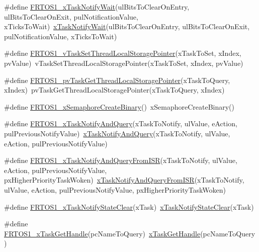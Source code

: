\begin{DoxyCompactItemize}
\item 
\#define \hyperlink{group___f_r_t_o_s1__module_gaa6ec29b95f2aeecae38d52ed20d63c10}{F\+R\+T\+O\+S1\+\_\+x\+Task\+Notify\+Wait}(ul\+Bits\+To\+Clear\+On\+Entry,  ul\+Bits\+To\+Clear\+On\+Exit,  pul\+Notification\+Value,  x\+Ticks\+To\+Wait)~\hyperlink{tasks_8c_a7cab914767933dc732f2c36e3915f6b0}{x\+Task\+Notify\+Wait}(ul\+Bits\+To\+Clear\+On\+Entry, ul\+Bits\+To\+Clear\+On\+Exit, pul\+Notification\+Value, x\+Ticks\+To\+Wait)
\item 
\#define \hyperlink{group___f_r_t_o_s1__module_ga7df09f2b8d36c2db315d58cc9879487f}{F\+R\+T\+O\+S1\+\_\+v\+Task\+Set\+Thread\+Local\+Storage\+Pointer}(x\+Task\+To\+Set,  x\+Index,  pv\+Value)~v\+Task\+Set\+Thread\+Local\+Storage\+Pointer(x\+Task\+To\+Set, x\+Index, pv\+Value)
\item 
\#define \hyperlink{group___f_r_t_o_s1__module_gac2a94f08f263fae6a729b0577b02a7d1}{F\+R\+T\+O\+S1\+\_\+pv\+Task\+Get\+Thread\+Local\+Storage\+Pointer}(x\+Task\+To\+Query,  x\+Index)~pv\+Task\+Get\+Thread\+Local\+Storage\+Pointer(x\+Task\+To\+Query, x\+Index)
\item 
\#define \hyperlink{group___f_r_t_o_s1__module_ga5c7b8fe8b16e29f5c01be043db9ae724}{F\+R\+T\+O\+S1\+\_\+x\+Semaphore\+Create\+Binary}()~x\+Semaphore\+Create\+Binary()
\item 
\#define \hyperlink{group___f_r_t_o_s1__module_ga1706d3232e8e1e6c58095692a0601cf5}{F\+R\+T\+O\+S1\+\_\+x\+Task\+Notify\+And\+Query}(x\+Task\+To\+Notify,  ul\+Value,  e\+Action,  pul\+Previous\+Notify\+Value)~\hyperlink{task_8h_aaa80adec29a2eebbfe0a551684a0acca}{x\+Task\+Notify\+And\+Query}(x\+Task\+To\+Notify, ul\+Value, e\+Action, pul\+Previous\+Notify\+Value)
\item 
\#define \hyperlink{group___f_r_t_o_s1__module_ga0eb38927fbf0d0c1f6a5f3f24c9d25c3}{F\+R\+T\+O\+S1\+\_\+x\+Task\+Notify\+And\+Query\+From\+I\+SR}(x\+Task\+To\+Notify,  ul\+Value,  e\+Action,  pul\+Previous\+Notify\+Value,  px\+Higher\+Priority\+Task\+Woken)~\hyperlink{task_8h_a5c491b42e243a91c7473887d1fb96dd5}{x\+Task\+Notify\+And\+Query\+From\+I\+SR}(x\+Task\+To\+Notify, ul\+Value, e\+Action, pul\+Previous\+Notify\+Value, px\+Higher\+Priority\+Task\+Woken)
\item 
\#define \hyperlink{group___f_r_t_o_s1__module_ga8410210c01dcbc1ecdaba90f141a4732}{F\+R\+T\+O\+S1\+\_\+x\+Task\+Notify\+State\+Clear}(x\+Task)~\hyperlink{tasks_8c_a4cb6c908a9d2d733e9d519d7dc27bb34}{x\+Task\+Notify\+State\+Clear}(x\+Task)
\item 
\#define \hyperlink{group___f_r_t_o_s1__module_ga30e411af81b88843d4023f1661e98a30}{F\+R\+T\+O\+S1\+\_\+x\+Task\+Get\+Handle}(pc\+Name\+To\+Query)~\hyperlink{tasks_8c_a86e945a322943dca5023dc49d1458b0c}{x\+Task\+Get\+Handle}(pc\+Name\+To\+Query)

\end{DoxyCompactItemize}
